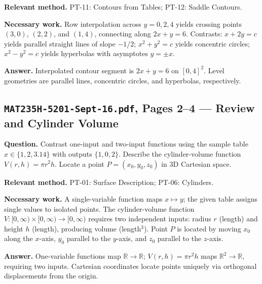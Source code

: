 \documentclass[11pt,letterpaper]{article}
\newcommand{\R}{\mathbb{R}}
\begin{document}
\textbf{Relevant method.} PT-11: Contours from Tables; PT-12: Saddle Contours.

\textbf{Necessary work.}
Row interpolation across $y=0, 2, 4$ yields crossing points $(3,0)$, $(2,2)$, and $(1,4)$, connecting along $2x+y=6$.
Contrasts: $x+2y=c$ yields parallel straight lines of slope $-1/2$; $x^2+y^2=c$ yields concentric circles; $x^2-y^2=c$ yields hyperbolas with asymptotes $y = \pm x$.

\textbf{Answer.}
Interpolated contour segment is $2x+y=6$ on $[0,4]^2$. Level geometries are parallel lines, concentric circles, and hyperbolas, respectively.

\subsection{\texttt{MAT235H-5201-Sept-16.pdf}, Pages 2--4 --- Review and Cylinder Volume}
\textbf{Question.} Contrast one-input and two-input functions using the sample table $x \in \{1, 2, 3.14\}$ with outputs $\{1, 0, 2\}$. Describe the cylinder-volume function $V(r,h) = \pi r^2 h$. Locate a point $P = (x_0, y_0, z_0)$ in 3D Cartesian space.

\textbf{Relevant method.} PT-01: Surface Description; PT-06: Cylinders.

\textbf{Necessary work.}
A single-variable function maps $x \mapsto y$; the given table assigns single values to isolated points. The cylinder-volume function $V: [0,\infty) \times [0,\infty) \to [0,\infty)$ requires two independent inputs: radius $r$ (length) and height $h$ (length), producing volume (length$^3$). Point $P$ is located by moving $x_0$ along the $x$-axis, $y_0$ parallel to the $y$-axis, and $z_0$ parallel to the $z$-axis.

\textbf{Answer.}
One-variable functions map $\R \to \R$; $V(r,h) = \pi r^2 h$ maps $\R^2 \to \R$, requiring two inputs. Cartesian coordinates locate points uniquely via orthogonal displacements from the origin.
\end{document}
